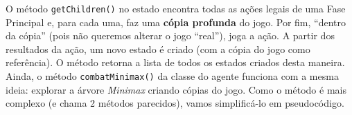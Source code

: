 

O método \texttt{getChildren()} no estado encontra todas as ações legais de uma Fase Principal e, para cada uma, faz uma \textbf{cópia profunda} do jogo. Por fim,  ``dentro da cópia'' (pois não queremos alterar o jogo ``real''), joga a ação. A partir dos resultados da ação, um novo estado é criado (com a cópia do jogo como referência). O método retorna a lista de todos os estados criados desta maneira. Ainda, o método \texttt{combatMinimax()} da classe do agente funciona com a mesma ideia: explorar a árvore \textit{Minimax} criando cópias do jogo. Como o método é mais complexo (e chama 2 métodos parecidos), vamos simplificá-lo em pseudocódigo.
